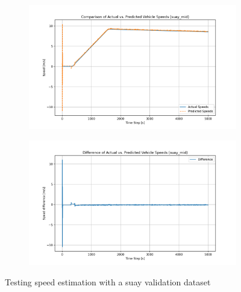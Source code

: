\begin{figure}[htbp]
    \centering

    \begin{subfigure}{1\textwidth}
        \centering
        \includegraphics[width=\linewidth]{images/RNN_results/model_0_suay_mid_act_vs_predicted_speed.png}
    \end{subfigure}
    \hfill
    \begin{subfigure}{1\textwidth}
        \centering
        \includegraphics[width=\linewidth]{images/RNN_results/model_0_suay_mid_act_vs_predicted_speed_diff.png}
    \end{subfigure}
    
    \caption{Testing speed estimation with a suay validation dataset}
    \label{fig:rnn_results_suay}
\end{figure}

